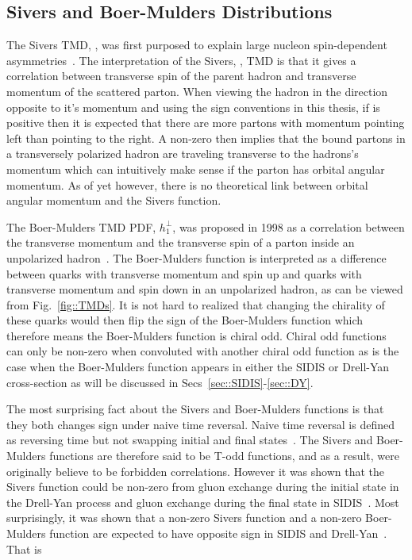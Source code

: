 \subsection{Sivers and Boer-Mulders Distributions}
The Sivers TMD, {\siv}, was first purposed to explain large nucleon
spin-dependent asymmetries~\cite{Sivers}.  The interpretation of the Sivers,
{\siv}, TMD is that it gives a correlation between transverse spin of the parent
hadron and transverse momentum of the scattered parton.  When viewing the hadron
in the direction opposite to it's momentum and using the sign conventions in
this thesis, if {\siv} is positive then it is expected that there are more
partons with momentum pointing left than pointing to the right.  A non-zero
{\siv} then implies that the bound partons in a transversely polarized hadron
are traveling transverse to the hadrons's momentum which can intuitively make
sense if the parton has orbital angular momentum.  As of yet however, there is
no theoretical link between orbital angular momentum and the Sivers function.

The Boer-Mulders TMD PDF, $h_1^{\perp}$, was proposed in 1998 as a correlation
between the transverse momentum and the transverse spin of a parton inside an
unpolarized hadron~\cite{Boer:1997nt}.  The Boer-Mulders function is
interpreted as a difference between quarks with transverse momentum and spin up
and quarks with transverse momentum and spin down in an unpolarized hadron, as
can be viewed from Fig.~\ref{fig::TMDs}.  It is not hard to realized that
changing the chirality of these quarks would then flip the sign of the
Boer-Mulders function which therefore means the Boer-Mulders function is chiral
odd.  Chiral odd functions can only be non-zero when convoluted with another
chiral odd function as is the case when the Boer-Mulders function appears in
either the SIDIS or Drell-Yan cross-section as will be discussed in
Secs~\ref{sec::SIDIS}-\ref{sec::DY}.

The most surprising fact about the Sivers and Boer-Mulders functions is that
they both changes sign under naive time reversal.  Naive time reversal is
defined as reversing time but not swapping initial and final
states~\cite{Bacchetta:2006tn}.  The Sivers and Boer-Mulders functions are
therefore said to be T-odd functions, and as a result, were originally believe
to be forbidden correlations.  However it was shown that the Sivers function
could be non-zero from gluon exchange during the initial state in the Drell-Yan
process and gluon exchange during the final state in
SIDIS~\cite{Brodsky:2002cx,Brodsky:2002rv}.  Most surprisingly, it was shown
that a non-zero Sivers function and a non-zero Boer-Mulders function are
expected to have opposite sign in SIDIS and Drell-Yan~\cite{collins_2002}.  That
is

